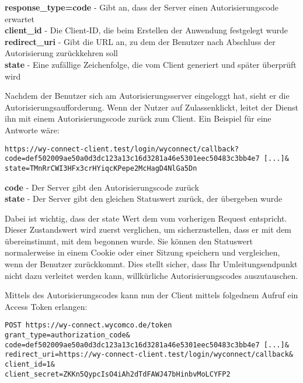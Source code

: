 \textbf{response\_type=code} - Gibt an, dass der Server einen Autorisierungscode erwartet \\
\textbf{client\_id} - Die Client-ID, die beim Erstellen der Anwendung festgelegt wurde \\
\textbf{redirect\_uri} - Gibt die URL an, zu dem der Benutzer nach Abschluss der Autorisierung zurückkehren soll \\
\textbf{state} - Eine zufällige Zeichenfolge, die vom Client generiert und später überprüft wird

Nachdem der Benutzer sich am Autorisierungsserver eingeloggt hat, sieht er die Autorisierungsaufforderung. Wenn der Nutzer auf \flqq Zulassen\frqq  klickt, leitet der Dienst ihn mit einem Autorisierungscode zurück zum Client. Ein Beispiel für eine Antworte wäre:

\texttt{https://wy-connect-client.test/login/wyconnect/callback?\\
code=def502009ae50a0d3dc123a13c16d3281a46e5301eec50483c3bb4e7 [...]\& \\
state=TMnRrCWI3HFx3crHYiqcKPepe2McHagD4NlGa5Dn
}

\textbf{code} - Der Server gibt den Autorisierungscode zurück \\
\textbf{state} - Der Server gibt den gleichen Statuswert zurück, der übergeben wurde

Dabei ist wichtig, dass der state Wert dem vom vorherigen Request entspricht. Dieser Zustandswert wird zuerst verglichen, um sicherzustellen, dass er mit dem übereinstimmt, mit dem begonnen wurde. Sie können den Statuswert normalerweise in einem Cookie oder einer Sitzung speichern und vergleichen, wenn der Benutzer zurückkommt. Dies stellt sicher, dass Ihr Umleitungsendpunkt nicht dazu verleitet werden kann, willkürliche Autorisierungscodes auszutauschen.

Mittels des Autorisierungscodes kann nun der Client mittels folgednem Aufruf ein Access Token erlangen: 

\texttt{POST https://wy-connect.wycomco.de/token \\
  grant\_type=authorization\_code\& \\
  code=def502009ae50a0d3dc123a13c16d3281a46e5301eec50483c3bb4e7 [...]\& \\
  redirect\_uri=https://wy-connect-client.test/login/wyconnect/callback\& \\
  client\_id=1\& \\
  client\_secret=ZKKn5QypcIsO4iAh2dTdFAWJ47bHinbvMoLCYFP2}
  
